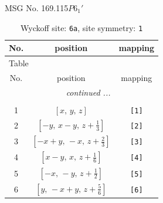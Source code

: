 \documentclass[fleqn,8pt]{jsarticle}
\begin{document}
\setcounter{MaxMatrixCols}{32}

\renewcommand{\tablename}{Table~}
\renewcommand{\figurename}{Figure~}
\begin{center}
\LARGE
MSG No. 169.115\quad$P6_{1}'$
\end{center}
\renewcommand{\arraystretch}{1.2}
\begin{longtable}{ccc}
\caption{Wyckoff site: {\tt 6a}, site symmetry: {\tt 1}}
 \\
 \hline \hline
No. & position & mapping \\ \hline \endfirsthead

\multicolumn{2}{l}{\tablename\ \thetable{}} \\
 \hline \hline
No. & position & mapping \\ \hline \endhead

 \hline \hline
\multicolumn{2}{r}{\footnotesize\it continued ...} \\ \endfoot

 \hline \hline
\multicolumn{2}{r}{} \\ \endlastfoot

1 & $\left[ x,\, y,\, z \right]$ & {\tt [1]} \\ \hline
2 & $\left[ - y,\, x - y,\, z + \frac{1}{3} \right]$ & {\tt [2]} \\ \hline
3 & $\left[ - x + y,\, - x,\, z + \frac{2}{3} \right]$ & {\tt [3]} \\ \hline
4 & $\left[ x - y,\, x,\, z + \frac{1}{6} \right]$ & {\tt [4]} \\ \hline
5 & $\left[ - x,\, - y,\, z + \frac{1}{2} \right]$ & {\tt [5]} \\ \hline
6 & $\left[ y,\, - x + y,\, z + \frac{5}{6} \right]$ & {\tt [6]} \\
\end{longtable}
\end{document}

